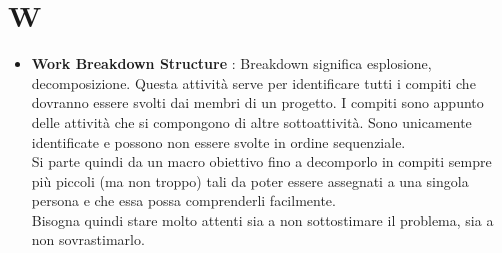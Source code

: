 % 
%
% 
%

\section{W}

\begin{itemize}
	\item \textbf{Work Breakdown Structure} : Breakdown significa esplosione, decomposizione. Questa attività serve per identificare tutti i compiti che dovranno essere svolti dai membri di un progetto. I compiti sono appunto delle attività che si compongono di altre sottoattività. Sono unicamente identificate e possono non essere svolte in ordine sequenziale. \\
Si parte quindi da un macro obiettivo fino a decomporlo in compiti sempre più piccoli (ma non troppo) tali da poter essere assegnati a una singola persona e che essa possa comprenderli facilmente. \\
Bisogna quindi stare molto attenti sia a non sottostimare il problema, sia a non sovrastimarlo.

\end{itemize}
